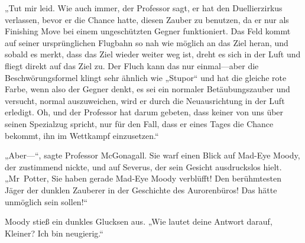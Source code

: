 „Tut mir leid. Wie auch immer, der Professor sagt, er hat den Duellierzirkus verlassen, bevor er die Chance hatte, diesen Zauber zu benutzen, da er nur als Finishing Move bei einem ungeschützten Gegner funktioniert. Das Feld kommt auf seiner ursprünglichen Flugbahn so nah wie möglich an das Ziel heran, und sobald es merkt, dass das Ziel wieder weiter weg ist, dreht es sich in der Luft und fliegt direkt auf das Ziel zu. Der Fluch kann das nur einmal—aber die Beschwörungsformel klingt sehr ähnlich wie „Stupor“ und hat die gleiche rote Farbe, wenn also der Gegner denkt, es sei ein normaler Betäubungszauber und versucht, normal auszuweichen, wird er durch die Neuausrichtung in der Luft erledigt. Oh, und der Professor hat darum gebeten, dass keiner von uns über seinen Spezialzug spricht, nur für den Fall, dass er eines Tages die Chance bekommt, ihn im Wettkampf einzusetzen.“

„Aber—“, sagte Professor McGonagall. Sie warf einen Blick auf Mad-Eye Moody, der zustimmend nickte, und auf Severus, der sein Gesicht ausdruckslos hielt. „Mr~Potter, Sie haben gerade Mad-Eye Moody verblüfft! Den berühmtesten Jäger der dunklen Zauberer in der Geschichte des Aurorenbüros! Das hätte unmöglich sein sollen!“

Moody stieß ein dunkles Glucksen aus. „Wie lautet deine Antwort darauf, Kleiner? Ich bin neugierig.“

